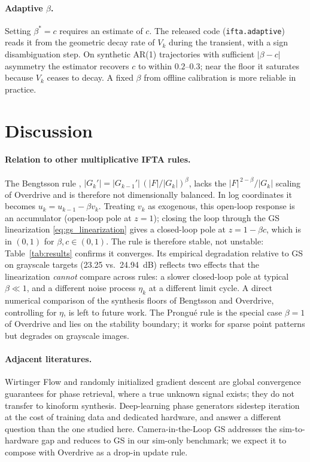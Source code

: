\documentclass[11pt,a4paper]{article}
\newcommand{\F}{\lvert F\rvert}
\newcommand{\Gk}{\lvert G_k\rvert}
\newcommand{\Gkm}{\lvert G_{k-1}'\rvert}
\newcommand{\Gkp}{\lvert G_k'\rvert}
\begin{document}
\paragraph{Adaptive $\beta$.} Setting $\beta^*=c$ requires an estimate of
$c$. The released code ({\tt ifta.adaptive}) reads it from the geometric
decay rate of $V_k$ during the transient, with a sign disambiguation step.
On synthetic AR(1) trajectories with sufficient $|\beta-c|$ asymmetry the
estimator recovers $c$ to within $0.2$--$0.3$; near the floor it saturates
because $V_k$ ceases to decay. A fixed $\beta$ from offline calibration is
more reliable in practice.

\section{Discussion}\label{sec:discussion}

\paragraph{Relation to other multiplicative IFTA rules.} The Bengtsson rule
\cite{Bengtsson1998}, $\Gkp = \Gkm\,(\F/\Gk)^{\beta}$, lacks the
$\F^{\,2-\beta}/\Gk$ scaling of Overdrive and is therefore not dimensionally
balanced. In log coordinates it becomes $u_k = u_{k-1} - \beta v_k$. Treating
$v_k$ as exogenous, this open-loop response is an accumulator (open-loop pole
at $z=1$); closing the loop through the GS linearization
\eqref{eq:gs_linearization} gives a closed-loop pole at $z = 1-\beta c$, which
is in $(0,1)$ for $\beta,c\in(0,1)$. The rule is therefore stable, not
unstable: Table~\ref{tab:results} confirms it converges. Its empirical
degradation relative to GS on grayscale targets (23.25 vs.\ 24.94~dB) reflects
two effects that the linearization \emph{cannot} compare across rules: a
slower closed-loop pole at typical $\beta\!\ll\!1$, and a different noise
process $\eta_k$ at a different limit cycle. A direct numerical comparison of
the synthesis floors of Bengtsson and Overdrive, controlling for $\eta$, is
left to future work. The Prongu\'e rule \cite{Prongue1992} is the special
case $\beta=1$ of Overdrive and lies on the stability boundary; it works for
sparse point patterns but degrades on grayscale images.

\paragraph{Adjacent literatures.} Wirtinger Flow \cite{Candes2014} and
randomly initialized gradient descent \cite{Chen2018} are global
convergence guarantees for phase retrieval, where a true unknown signal
exists; they do not transfer to kinoform synthesis. Deep-learning phase
generators \cite{Zheng2021,Sun2022,Zhu2025} sidestep iteration at the cost
of training data and dedicated hardware, and answer a different question
than the one studied here. Camera-in-the-Loop GS \cite{Peng2020} addresses
the sim-to-hardware gap and reduces to GS in our sim-only benchmark; we
expect it to compose with Overdrive as a drop-in update rule.
\end{document}
